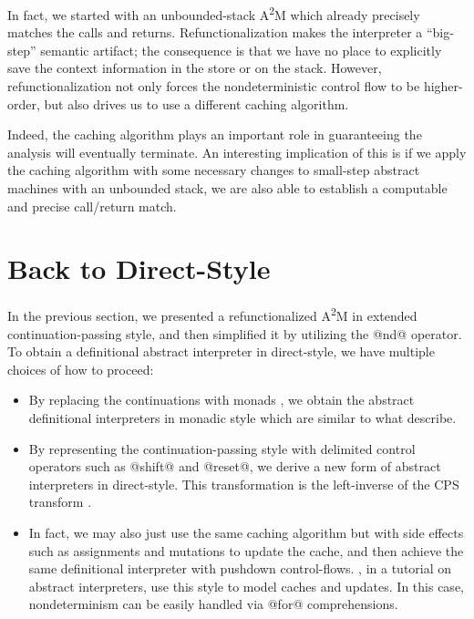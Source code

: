 \documentclass[acmsmall, screen]{acmart}\settopmatter{}
\begin{document}
In fact, we started with an unbounded-stack A\textsuperscript{2}M which already precisely
matches the calls and returns. Refunctionalization makes the interpreter a ``big-step''
semantic artifact; the consequence is that we have no place to explicitly save the context
information in the store or on the stack.
However, refunctionalization not only forces the nondeterministic control flow to be higher-order,
but also drives us to use a different caching algorithm.

Indeed, the caching algorithm plays an important role in guaranteeing
the analysis will eventually terminate.
An interesting implication of this is if we apply the caching algorithm with some
necessary changes to small-step abstract machines with an unbounded stack, we are
also able to establish a computable and precise call/return match.

\section{Back to Direct-Style} \label{directstyle}

In the previous section, we presented a refunctionalized A\textsuperscript{2}M in extended continuation-passing style,
and then simplified it by utilizing the @nd@ operator.
To obtain a definitional abstract interpreter in direct-style, we have multiple choices of how to proceed:

\begin{itemize}
  \item By replacing the continuations with monads \cite{filinski1994representing},
    we obtain the abstract definitional interpreters in monadic style which are similar to what
    \citet{darais2017abstracting} describe.
  \item By representing the continuation-passing style with delimited control operators
    such as @shift@ and @reset@, we derive a new form of abstract interpreters in direct-style.
    This transformation is the left-inverse of the CPS transform \cite{DBLP:journals/scp/Danvy94, DBLP:conf/lfp/DanvyL92}.
  \item In fact, we may also just use the same caching algorithm but with side effects such as
    assignments and mutations to update the cache, and then achieve the same definitional
    interpreter with pushdown control-flows. , in a tutorial on abstract
    interpreters, use this style to model caches and updates.
    In this case, nondeterminism can be easily handled via @for@ comprehensions.
\end{itemize}
\end{document}
